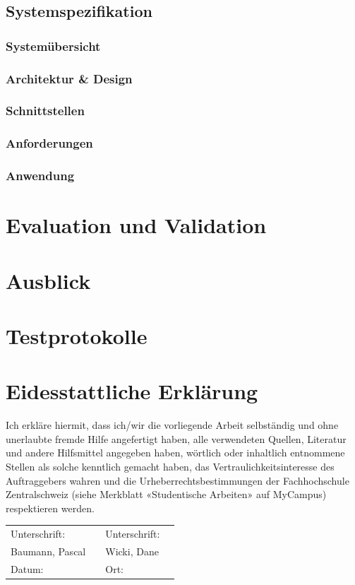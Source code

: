 \documentclass[a4paper]{scrreprt}
\begin{document}
\section{Systemspezifikation}

\subsection{Systemübersicht}

\subsection{Architektur \& Design}

\subsection{Schnittstellen}

\subsection{Anforderungen}

\subsection{Anwendung}

\chapter{Evaluation und Validation}

\chapter{Ausblick}

\appendix

\chapter{Testprotokolle}



\listoffigures

\listoftables

\listofmyequations \pagebreak

\printbibliography

\chapter*{Eidesstattliche Erklärung}
Ich erkläre hiermit, dass ich/wir die vorliegende Arbeit selbständig und ohne unerlaubte fremde Hilfe angefertigt haben, alle verwendeten Quellen, Literatur und andere Hilfsmittel angegeben haben, wörtlich oder inhaltlich entnommene Stellen als solche kenntlich gemacht haben, das Vertraulichkeitsinteresse des Auftraggebers wahren und die Urheberrechtsbestimmungen der Fachhochschule Zentralschweiz (siehe Merkblatt «Studentische Arbeiten» auf MyCampus) respektieren werden.

\vspace{1em}

\renewcommand{\arraystretch}{2}
\begin{tabularx}{\textwidth}{XXXX}
	Unterschrift: & & Unterschrift: & \\ \cline{2-2}\cline{4-4}
	Baumann, Pascal & & Wicki, Dane & \\
	Datum: & & Ort: & \\
\end{tabularx}
\end{document}
